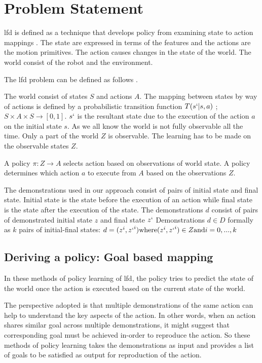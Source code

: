 \section{Problem Statement}

\acrfull{lfd} is defined as a technique that develops policy from examining
state to action mappings \cite{argall_survey_2009}. The state are expressed in
terms of the features and the actions are the motion primitives. The action
causes changes in the state of the world. The world consist of the robot and
the environment. 

The \acrshort{lfd} problem can be defined as follows \cite{argall_survey_2009}. 

The world consist of states $S$ and actions $A$. The mapping between states by
way of actions is defined by a probabilistic transition function $T(s`|s, a) $
; $S \times A \times S \rightarrow [0,1]$. $s`$ is the resultant state due to
the execution of the action $a$ on the initial state $s$. As we all know the
world is not fully observable all the time. Only a part of the world $Z$ is
observable. The learning has to be made on the observable states $Z$.

A policy $\pi : Z \rightarrow A $ selects action based on observations of world
state. A policy determines which action $a$ to execute from $A$ based on the
observations $Z$. 


The demonstrations used in our approach consist of pairs of initial state and
final state. Initial state is the state before the execution of an action while
final state is the state after the execution of the state. The demonstrations
$d$ consist of pairs of demonstrated initial state $z$ and final state $z`$
Demonstrations $d \in D$ formally as $k$ pairs of initial-final states: $d =
{(z^i , {z`}^i)} \text{where} (z^i, {z`}^i) \in Z \text{and}  i = 0,...,k$

\subsection{Deriving a policy: Goal based mapping}

In these methods of policy learning of \acrshort{lfd}, the policy tries to
predict the state of the world once the action is executed based on the current
state of the world.

The perspective adopted is that multiple demonstrations of the same action can
help to understand the key aspects of the action. In other words, when an
action shares similar goal across multiple demonstrations, it might suggest
that corresponding goal must be achieved in-order to reproduce the action. So
these methods of policy learning takes the demonstrations as input and provides
a list of goals to be satisfied as output for reproduction of the action.

